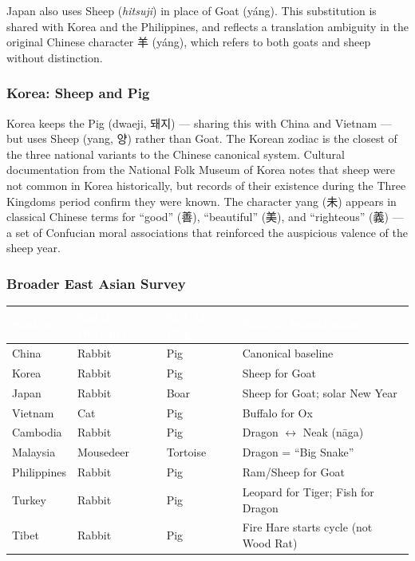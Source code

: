\documentclass[11pt,letterpaper]{article}
\newcommand{\tableheader}[1]{\textbf{\sffamily\textcolor{white}{#1}}}
\begin{document}
Japan also uses Sheep (\textit{hitsuji}) in place of Goat (y\'{a}ng). This substitution is shared with Korea and the Philippines, and reflects a translation ambiguity in the original Chinese character 羊 (y\'{a}ng), which refers to both goats and sheep without distinction.

\subsubsection{Korea: Sheep and Pig}

Korea keeps the Pig (dwaeji, 돼지) --- sharing this with China and Vietnam --- but uses Sheep (yang, 양) rather than Goat. The Korean zodiac is the closest of the three national variants to the Chinese canonical system. Cultural documentation from the National Folk Museum of Korea notes that sheep were not common in Korea historically, but records of their existence during the Three Kingdoms period confirm they were known. The character yang (未) appears in classical Chinese terms for ``good'' (善), ``beautiful'' (美), and ``righteous'' (義) --- a set of Confucian moral associations that reinforced the auspicious valence of the sheep year.

\subsubsection{Broader East Asian Survey}

\begin{center}
\begin{tabularx}{\textwidth}{L{2.5cm}L{2cm}L{2cm}X}
\toprule
{}
\tableheader{Nation} & \tableheader{Slot 4 (Rabbit)} & \tableheader{Slot 12 (Pig)} & \tableheader{Notable Substitution} \\
\midrule
China & Rabbit & Pig & Canonical baseline \\
Korea & Rabbit & Pig & Sheep for Goat \\
Japan & Rabbit & Boar & Sheep for Goat; solar New Year \\
Vietnam & Cat & Pig & Buffalo for Ox \\
Cambodia & Rabbit & Pig & Dragon $\leftrightarrow$ Neak (n\={a}ga) \\
Malaysia & Mousedeer & Tortoise & Dragon = ``Big Snake'' \\
Philippines & Rabbit & Pig & Ram/Sheep for Goat \\
Turkey & Rabbit & Pig & Leopard for Tiger; Fish for Dragon \\
Tibet & Rabbit & Pig & Fire Hare starts cycle (not Wood Rat) \\
\bottomrule
\end{tabularx}
\end{center}
\end{document}
